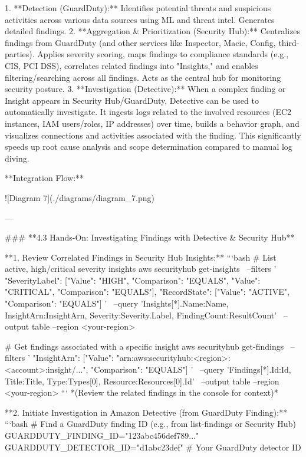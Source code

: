 \documentclass{article}
\begin{document}
1.  **Detection (GuardDuty):** Identifies potential threats and suspicious activities across various data sources using ML and threat intel. Generates detailed findings.
2.  **Aggregation & Prioritization (Security Hub):** Centralizes findings from GuardDuty (and other services like Inspector, Macie, Config, third-parties). Applies severity scoring, maps findings to compliance standards (e.g., CIS, PCI DSS), correlates related findings into "Insights," and enables filtering/searching across all findings. Acts as the central hub for monitoring security posture.
3.  **Investigation (Detective):** When a complex finding or Insight appears in Security Hub/GuardDuty, Detective can be used to automatically investigate. It ingests logs related to the involved resources (EC2 instances, IAM users/roles, IP addresses) over time, builds a behavior graph, and visualizes connections and activities associated with the finding. This significantly speeds up root cause analysis and scope determination compared to manual log diving.

**Integration Flow:**


![Diagram 7](./diagrams/diagram_7.png)



---

### **4.3 Hands-On: Investigating Findings with Detective & Security Hub**

**1. Review Correlated Findings in Security Hub Insights:**
```bash
# List active, high/critical severity insights
aws securityhub get-insights \
    --filters '{ "SeverityLabel": [{"Value": "HIGH", "Comparison": "EQUALS"}, {"Value": "CRITICAL", "Comparison": "EQUALS"}], "RecordState": [{"Value": "ACTIVE", "Comparison": "EQUALS"}] }' \
    --query 'Insights[*].{Name:Name, InsightArn:InsightArn, Severity:Severity.Label, FindingCount:ResultCount}' \
    --output table --region <your-region>

# Get findings associated with a specific insight
aws securityhub get-findings \
    --filters '{ "InsightArn": [{"Value": "arn:aws:securityhub:<region>:<account>:insight/...", "Comparison": "EQUALS"}] }' \
    --query 'Findings[*].{Id:Id, Title:Title, Type:Types[0], Resource:Resources[0].Id}' \
    --output table --region <your-region>
```
*(Review the related findings in the console for context)*

**2. Initiate Investigation in Amazon Detective (from GuardDuty Finding):**
```bash
# Find a GuardDuty finding ID (e.g., from list-findings or Security Hub)
GUARDDUTY_FINDING_ID="123abc456def789..."
GUARDDUTY_DETECTOR_ID="d1abc23def" # Your GuardDuty detector ID
\end{document}
